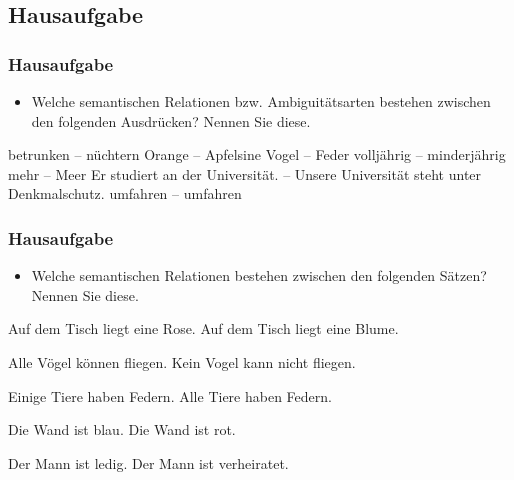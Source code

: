 %
\subsection{Hausaufgabe}
%



\begin{frame}
\frametitle{Hausaufgabe}

\begin{itemize}
	\item Welche semantischen Relationen bzw. Ambiguitätsarten bestehen zwischen den folgenden Ausdrücken? Nennen Sie diese.
\end{itemize}

\ea 
\ea \label{ex:07HA1} betrunken -- nüchtern
\ex \label{ex:07HA2} Orange -- Apfelsine
\ex \label{ex:07HA3} Vogel -- Feder
\ex \label{ex:07HA4} volljährig -- minderjährig
\ex \label{ex:07HA5} mehr -- Meer
\ex \label{ex:07HA12} Er studiert an der Universität. -- Unsere Universität steht unter Denkmalschutz.
\ex \label{ex:07HA13} umfahren -- umfahren
\z 	
\z 
\end{frame}



\begin{frame}
\frametitle{Hausaufgabe}

\begin{itemize}
	\item Welche semantischen Relationen bestehen zwischen den folgenden Sätzen? Nennen Sie diese.
\end{itemize}

\ea
	\ea \label{ex:07HA6} Auf dem Tisch liegt eine Rose.
	\ex \label{ex:07HA7} Auf dem Tisch liegt eine Blume.
\z

\ex
	\ea \label{ex:07HA8} Alle Vögel können fliegen.
	\ex \label{ex:07HA9} Kein Vogel kann nicht fliegen.
\z

\ex
	\ea \label{ex:07HA10} Einige Tiere haben Federn.
	\ex \label{ex:07HA11} Alle Tiere haben Federn.
\z

\ex
	\ea \label{ex:07HA14} Die Wand ist blau.
	\ex \label{ex:07HA15} Die Wand ist rot.
\z

\ex
	\ea \label{ex:07HA16} Der Mann ist ledig.
	\ex \label{ex:07HA17} Der Mann ist verheiratet.
\z
\z 
\end{frame}


